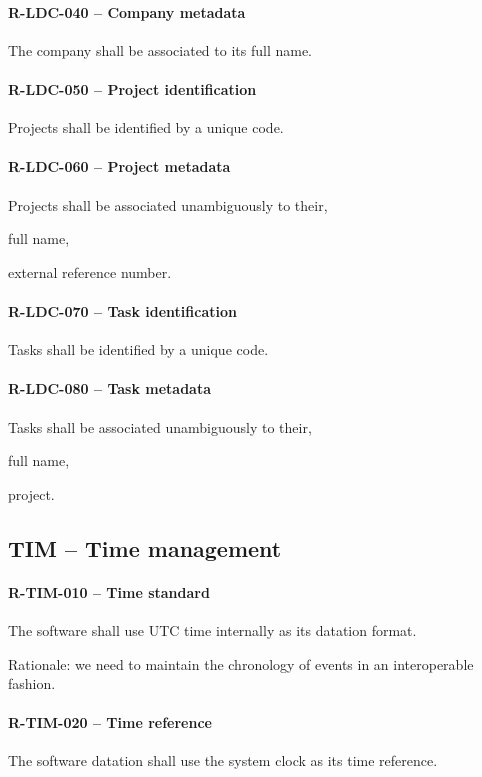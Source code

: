 \paragraph{R-LDC-040 -- Company metadata}
The company shall be associated to its full name.

\paragraph{R-LDC-050 -- Project identification}
Projects shall be identified by a unique code.

\paragraph{R-LDC-060 -- Project metadata}
Projects shall be associated unambiguously to their,
\begin{compactitem}
  \item full name,
  \item external reference number.
\end{compactitem}

\paragraph{R-LDC-070 -- Task identification}
Tasks shall be identified by a unique code.

\paragraph{R-LDC-080 -- Task metadata}
Tasks shall be associated unambiguously to their,
\begin{compactitem}
  \item full name,
  \item project.
\end{compactitem}

\subsection{TIM -- Time management}
\paragraph{R-TIM-010 -- Time standard}
The software shall use \gls{UTC} time internally as its datation format.

Rationale: we need to maintain the chronology of events in an interoperable
fashion.

\paragraph{R-TIM-020 -- Time reference}
The software datation shall use the system clock as its time reference.

